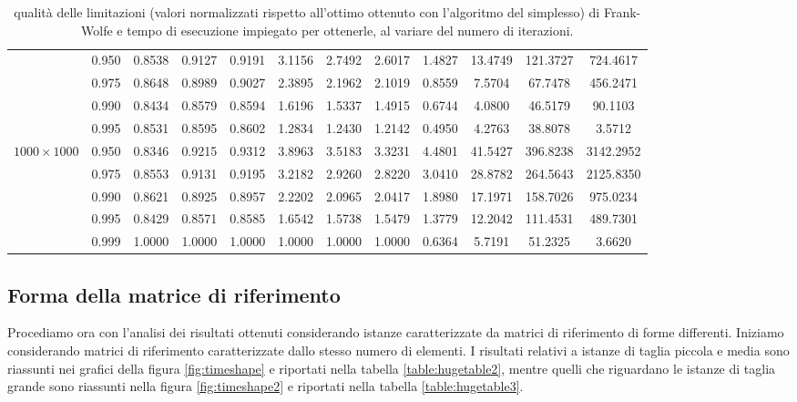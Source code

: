 \begin{landscape}
\begin{table}[!h]
\begin{tabularx}{665.19638pt}{cccccccccccc}
        & 0.950 & 0.8538 & 0.9127 & 0.9191 & 3.1156 & 2.7492 & 2.6017 & 1.4827 & 13.4749 & 121.3727 & 724.4617 \\
        & 0.975 & 0.8648 & 0.8989 & 0.9027 & 2.3895 & 2.1962 & 2.1019 & 0.8559 & 7.5704 & 67.7478 & 456.2471 \\
        & 0.990 & 0.8434 & 0.8579 & 0.8594 & 1.6196 & 1.5337 & 1.4915 & 0.6744 & 4.0800 & 46.5179 & 90.1103 \\
        & 0.995 & 0.8531 & 0.8595 & 0.8602 & 1.2834 & 1.2430 & 1.2142 & 0.4950 & 4.2763 & 38.8078 & 3.5712 \\
        \midrule
        \( 1000\times 1000 \)
        & 0.950 & 0.8346 & 0.9215 & 0.9312 & 3.8963 & 3.5183 & 3.3231 & 4.4801 & 41.5427 & 396.8238 & 3142.2952 \\
        & 0.975 & 0.8553 & 0.9131 & 0.9195 & 3.2182 & 2.9260 & 2.8220 & 3.0410 & 28.8782 & 264.5643 & 2125.8350 \\
        & 0.990 & 0.8621 & 0.8925 & 0.8957 & 2.2202 & 2.0965 & 2.0417 & 1.8980 & 17.1971 & 158.7026 & 975.0234 \\
        & 0.995 & 0.8429 & 0.8571 & 0.8585 & 1.6542 & 1.5738 & 1.5479 & 1.3779 & 12.2042 & 111.4531 & 489.7301 \\
        & 0.999 & 1.0000 & 1.0000 & 1.0000 & 1.0000 & 1.0000 & 1.0000 & 0.6364 & 5.7191 & 51.2325 & 3.6620 \\
        \bottomrule
    \end{tabularx}
    \caption{qualità delle limitazioni (valori normalizzati rispetto all'ottimo ottenuto con l'algoritmo del simplesso)
    di Frank-Wolfe e tempo di esecuzione impiegato per ottenerle, al variare del numero di iterazioni.}
    \label{table:hugetable}
\end{table}
\end{landscape}

\subsection{Forma della matrice di riferimento}
Procediamo ora con l'analisi dei risultati ottenuti considerando istanze caratterizzate da matrici di riferimento di
forme differenti. Iniziamo considerando matrici di riferimento caratterizzate dallo stesso numero di elementi. I
risultati relativi a istanze di taglia piccola e media sono riassunti nei grafici della figura \ref{fig:timeshape} e
riportati nella tabella \ref{table:hugetable2}, mentre quelli che riguardano le istanze di taglia grande sono riassunti
nella figura \ref{fig:timeshape2} e riportati nella tabella \ref{table:hugetable3}.

